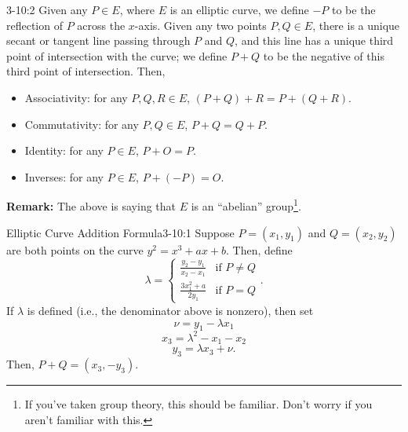 \documentclass[letterpaper]{article}
\begin{document}
\begin{itemize}
    \begin{theorem}{}{3-10:2}
        Given any $P \in E$, where $E$ is an elliptic curve, we define $-P$ to be the reflection of $P$ across the $x$-axis. Given any two points $P, Q \in E$, there is a unique secant or tangent line passing through $P$ and $Q$, and this line has a unique third point of intersection with the curve; we define $P + Q$ to be the negative of this third point of intersection. Then, 
        \begin{itemize}
            \item Associativity: for any $P, Q, R \in E$, $(P + Q) + R = P + (Q + R)$.
            \item Commutativity: for any $P, Q \in E$, $P + Q = Q + P.$
            \item Identity: for any $P \in E$, $P + O = P.$
            \item Inverses: for any $P \in E$, $P + (-P) = O.$
        \end{itemize}
    \end{theorem}
    \textbf{Remark:} The above is saying that $E$ is an ``abelian'' group\footnote{If you've taken group theory, this should be familiar. Don't worry if you aren't familiar with this.}.
\end{itemize} 

\begin{theorem}{Elliptic Curve Addition Formula}{3-10:1}
    Suppose $P = (x_1, y_1)$ and $Q = (x_2, y_2)$ are both points on the curve $y^2 = x^3 + ax + b$. Then, define 
    \[\lambda = \begin{cases}
        \frac{y_2 - y_1}{x_2 - x_1} & \text{if } P \neq Q \\ 
        \frac{3x_1^2 + a}{2y_1} & \text{if } P = Q 
    \end{cases}.\]
    If $\lambda$ is defined (i.e., the denominator above is nonzero), then set 
    \[\nu = y_1 - \lambda x_1\]
    \[x_3 = \lambda^2 - x_1 - x_2\]
    \[y_3 = \lambda x_3 + \nu.\]
    Then, $P + Q = (x_3, -y_3)$. 
\end{theorem}
\end{document}

